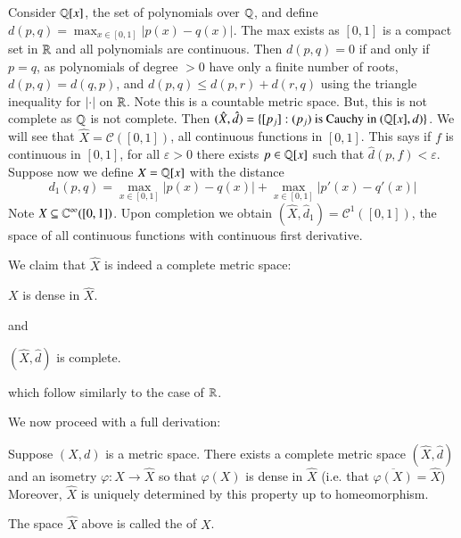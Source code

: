 \begin{eg}
    Consider $\mathbb Q[x]$, the set of polynomials over $\mathbb Q$, and define $d(p,q) = \max_{x \in [0,1]}|p(x) - q(x)|$. The max exists as $[0,1]$ is a compact set in $\mathbb R$ and all polynomials are continuous. Then $d(p,q) = 0$ if and only if $p = q$, as polynomials of degree $> 0$ have only a finite number of roots, $d(p,q) = d(q,p)$, and $d(p,q) \leq d(p,r) + d(r,q)$ using the triangle inequality for $|\cdot|$ on $\mathbb R$. Note this is a countable metric space. But, this is not complete as $\mathbb Q$ is not complete. Then $(\hat{X},\hat{d}) = \{[p_j]:(p_j)\text{ is Cauchy in }(\mathbb Q[x],d)\}$. We will see that $\hat{X} = \mathcal{C}([0,1])$, all continuous functions in $[0,1]$. This says if $f$ is continuous in $[0,1]$, for all $\varepsilon > 0$ there exists $p \in \mathbb Q[x]$ such that $\hat{d}(p,f) < \varepsilon$. Suppose now we define $X = \mathbb Q[x]$ with the distance \begin{equation*}
        d_1(p,q) = \max_{x \in [0,1]}|p(x) - q(x)| + \max_{x \in [0,1]}|p'(x) - q'(x)|
    \end{equation*}
    Note $X \subseteq \mathbb C^{\infty}([0,1])$. Upon completion we obtain $(\hat{X},\hat{d}_1) = \mathcal{C}^1([0,1])$, the space of all continuous functions with continuous first derivative.
\end{eg}

We claim that $\hat{X}$ is indeed a complete metric space:

\begin{lem}
    $X$ is dense in $\hat{X}$.
\end{lem}
and 
\begin{prop}
    $(\hat{X},\hat{d})$ is complete.
\end{prop}
which follow similarly to the case of $\mathbb R$.


We now proceed with a full derivation:

\begin{thm}
    Suppose $(X,d)$ is a metric space. There exists a complete metric space $(\hat{X},\hat{d})$ and an isometry $\varphi:X\rightarrow \hat{X}$ so that $\varphi(X)$ is dense in $\hat{X}$ (i.e. that $\overline{\varphi(X)} = \hat{X}$) Moreover, $\hat{X}$ is uniquely determined by this property up to homeomorphism.
\end{thm}

\begin{defn}
    The space $\hat{X}$ above is called the  of $X$.
\end{defn}

